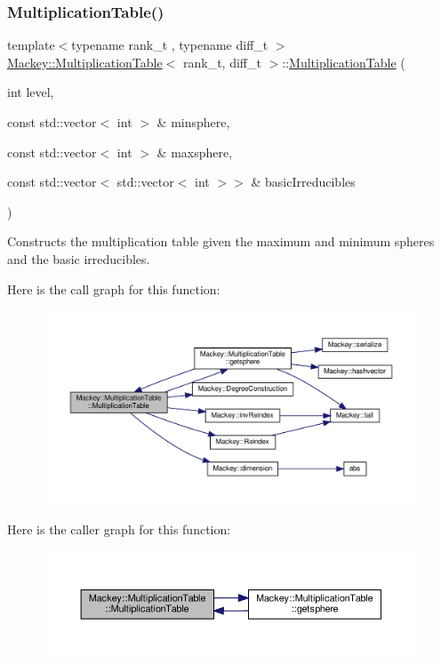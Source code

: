 \subsubsection{\texorpdfstring{Multiplication\+Table()}{MultiplicationTable()}}
{\footnotesize\ttfamily template$<$typename rank\+\_\+t , typename diff\+\_\+t $>$ \\
\hyperlink{classMackey_1_1MultiplicationTable}{Mackey\+::\+Multiplication\+Table}$<$ rank\+\_\+t, diff\+\_\+t $>$\+::\hyperlink{classMackey_1_1MultiplicationTable}{Multiplication\+Table} (\begin{DoxyParamCaption}\item[{int}]{level,  }\item[{const std\+::vector$<$ int $>$ \&}]{minsphere,  }\item[{const std\+::vector$<$ int $>$ \&}]{maxsphere,  }\item[{const std\+::vector$<$ std\+::vector$<$ int $>$$>$ \&}]{basic\+Irreducibles }\end{DoxyParamCaption})}



Constructs the multiplication table given the maximum and minimum spheres and the basic irreducibles. 

Here is the call graph for this function\+:\nopagebreak
\begin{figure}[H]
\begin{center}
\leavevmode
\includegraphics[width=350pt]{classMackey_1_1MultiplicationTable_a8530e27d8d2c3c755eb5041a2ee8c35b_cgraph}
\end{center}
\end{figure}
Here is the caller graph for this function\+:\nopagebreak
\begin{figure}[H]
\begin{center}
\leavevmode
\includegraphics[width=350pt]{classMackey_1_1MultiplicationTable_a8530e27d8d2c3c755eb5041a2ee8c35b_icgraph}
\end{center}
\end{figure}


